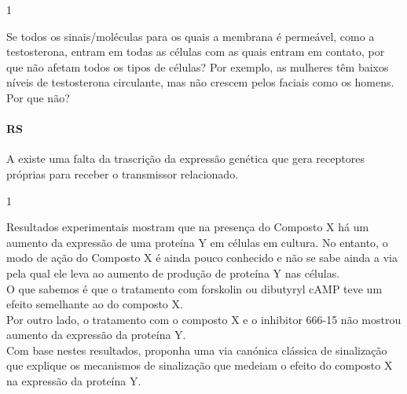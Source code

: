 \documentclass[\mainfilename]{subfiles}
\begin{document}
\begin{questionBox}1{} %
    
    Se todos os sinais/moléculas para os quais a membrana é permeável, como a testosterona, entram em todas as células com as quais entram em contato, por que não afetam todos os tipos de células? Por exemplo, as mulheres têm baixos níveis de testosterona circulante, mas não crescem pelos faciais como os homens. Por que não?

    \paragraph*{RS} A existe uma falta da trascrição da expressão genética que gera receptores próprias para receber o transmissor relacionado.
    
\end{questionBox}

\begin{questionBox}1{} %
    
    Resultados experimentais mostram que na presença do Composto X há um aumento da expressão de uma proteína Y em células em cultura. No entanto, o modo de ação do Composto X é ainda pouco conhecido e não se sabe ainda a via pela qual ele leva ao aumento de produção de proteína Y nas células.\\

    O que sabemos é que o tratamento com forskolin ou dibutyryl cAMP teve um efeito semelhante ao do composto X.\\

    Por outro lado, o tratamento com o composto X e o inhibitor 666-15 não mostrou aumento da expressão da proteína Y.\\

    Com base nestes resultados, proponha uma via canónica clássica de sinalização que explique os mecanismos de sinalização que medeiam o efeito do composto X na expressão da proteína Y.
    
\end{questionBox}
\end{document}
